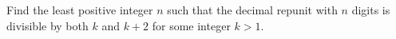 Find the least positive integer $n$ such that the decimal repunit with $n$ digits is divisible by both $k$ and $k+2$ for some integer $k>1$.
